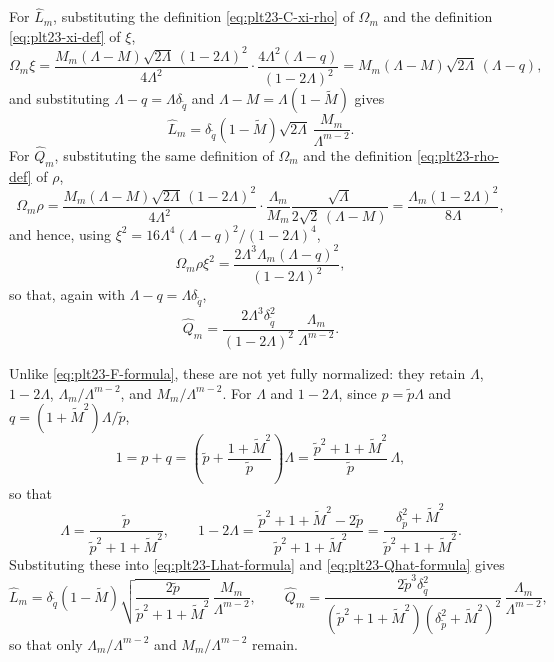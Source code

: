 ﻿\documentclass[11pt]{article}
\numberwithin{equation}{section}
\begin{document}
For $\widehat L_m$, substituting the definition \eqref{eq:plt23-C-xi-rho} of $\Omega_m$ and the definition \eqref{eq:plt23-xi-def} of $\xi$,
\[
  \Omega_m\xi
  =\frac{M_m(\Lambda-M)\sqrt{2\Lambda}\,(1-2\Lambda)^2}{4\Lambda^2}
   \cdot\frac{4\Lambda^2(\Lambda-q)}{(1-2\Lambda)^2}
  =M_m(\Lambda-M)\sqrt{2\Lambda}\,(\Lambda-q),
\]
and substituting $\Lambda-q=\Lambda\delta_{\tilde q}$ and $\Lambda-M=\Lambda(1-\tilde M)$ gives
\begin{equation}\label{eq:plt23-Lhat-formula}
  \widehat L_m
  =\delta_{\tilde q}(1-\tilde M)\sqrt{2\Lambda}\,
   \frac{M_m}{\Lambda^{m-2}}.
\end{equation}
For $\widehat Q_m$, substituting the same definition of $\Omega_m$ and the definition \eqref{eq:plt23-rho-def} of $\rho$,
\[
  \Omega_m\rho
  =\frac{M_m(\Lambda-M)\sqrt{2\Lambda}\,(1-2\Lambda)^2}{4\Lambda^2}
   \cdot\frac{\Lambda_m}{M_m}\frac{\sqrt\Lambda}{2\sqrt2\,(\Lambda-M)}
  =\frac{\Lambda_m(1-2\Lambda)^2}{8\Lambda},
\]
and hence, using $\xi^2=16\Lambda^4(\Lambda-q)^2/(1-2\Lambda)^4$,
\[
  \Omega_m\rho\xi^2=\frac{2\Lambda^3\Lambda_m(\Lambda-q)^2}{(1-2\Lambda)^2},
\]
so that, again with $\Lambda-q=\Lambda\delta_{\tilde q}$,
\begin{equation}\label{eq:plt23-Qhat-formula}
  \widehat Q_m
  =\frac{2\Lambda^3\delta_{\tilde q}^2}{(1-2\Lambda)^2}\,
   \frac{\Lambda_m}{\Lambda^{m-2}}.
\end{equation}

Unlike \eqref{eq:plt23-F-formula}, these are not yet fully normalized: they retain $\Lambda$, $1-2\Lambda$, $\Lambda_m/\Lambda^{m-2}$, and $M_m/\Lambda^{m-2}$.
For $\Lambda$ and $1-2\Lambda$, since $p=\tilde p\Lambda$ and $q=(1+\tilde M^2)\Lambda/\tilde p$,
\[
  1=p+q
  =\left(\tilde p+\frac{1+\tilde M^2}{\tilde p}\right)\Lambda
  =\frac{\tilde p^2+1+\tilde M^2}{\tilde p}\,\Lambda,
\]
so that
\[
  \Lambda=\frac{\tilde p}{\tilde p^2+1+\tilde M^2},
  \qquad
  1-2\Lambda=\frac{\tilde p^2+1+\tilde M^2-2\tilde p}{\tilde p^2+1+\tilde M^2}
  =\frac{\delta_{\tilde p}^2+\tilde M^2}{\tilde p^2+1+\tilde M^2}.
\]
Substituting these into \eqref{eq:plt23-Lhat-formula} and \eqref{eq:plt23-Qhat-formula} gives
\begin{equation}\label{eq:plt23-QL-Delta}
  \widehat L_m
  =\delta_{\tilde q}(1-\tilde M)
   \sqrt{\frac{2\tilde p}{\tilde p^2+1+\tilde M^2}}\,
   \frac{M_m}{\Lambda^{m-2}},
  \qquad
  \widehat Q_m
  =\frac{2\tilde p^3\delta_{\tilde q}^2}
        {(\tilde p^2+1+\tilde M^2)(\delta_{\tilde p}^2+\tilde M^2)^2}\,
   \frac{\Lambda_m}{\Lambda^{m-2}},
\end{equation}
so that only $\Lambda_m/\Lambda^{m-2}$ and $M_m/\Lambda^{m-2}$ remain.
\end{document}
